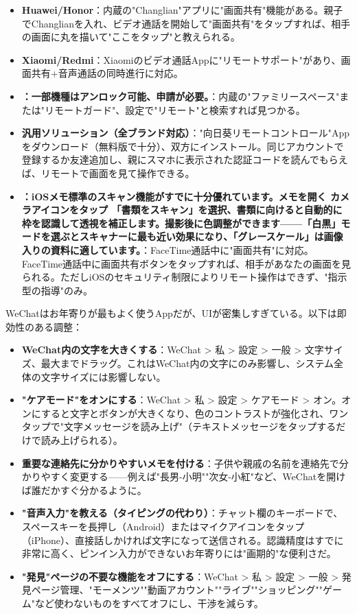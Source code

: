 \begin{itemize}
  \item \textbf{Huawei/Honor}：内蔵の"Changlian"アプリに"画面共有"機能がある。親子でChanglianを入れ、ビデオ通話を開始して"画面共有"をタップすれば、相手の画面に丸を描いて"ここをタップ"と教えられる。
  \item \textbf{Xiaomi/Redmi}：Xiaomiのビデオ通話Appに"リモートサポート"があり、画面共有+音声通話の同時進行に対応。
  \item \textbf{：一部機種はアンロック可能、申請が必要。}：内蔵の"ファミリースペース"または"リモートガード"、設定で"リモート"と検索すれば見つかる。
  \item \textbf{汎用ソリューション（全ブランド対応）}："向日葵リモートコントロール"Appをダウンロード（無料版で十分）、双方にインストール。同じアカウントで登録するか友達追加し、親にスマホに表示された認証コードを読んでもらえば、リモートで画面を見て操作できる。
  \item \textbf{：iOSメモ標準のスキャン機能がすでに十分優れています。メモを開く カメラアイコンをタップ 「書類をスキャン」を選択、書類に向けると自動的に枠を認識して透視を補正します。撮影後に色調整ができます——「白黒」モードを選ぶとスキャナーに最も近い効果になり、「グレースケール」は画像入りの資料に適しています。}：FaceTime通話中に"画面共有"に対応。FaceTime通話中に画面共有ボタンをタップすれば、相手があなたの画面を見られる。ただしiOSのセキュリティ制限によりリモート操作はできず、"指示型の指導"のみ。
\end{itemize}


WeChatはお年寄りが最もよく使うAppだが、UIが密集しすぎている。以下は即効性のある調整：

\begin{itemize}
  \item \textbf{WeChat内の文字を大きくする}：WeChat > 私 > 設定 > 一般 > 文字サイズ、最大までドラッグ。これはWeChat内の文字にのみ影響し、システム全体の文字サイズには影響しない。
  \item \textbf{"ケアモード"をオンにする}：WeChat > 私 > 設定 > ケアモード > オン。オンにすると文字とボタンが大きくなり、色のコントラストが強化され、ワンタップで"文字メッセージを読み上げ"（テキストメッセージをタップするだけで読み上げられる）。
  \item \textbf{重要な連絡先に分かりやすいメモを付ける}：子供や親戚の名前を連絡先で分かりやすく変更する——例えば"長男-小明""次女-小紅"など、WeChatを開けば誰だかすぐ分かるように。
  \item \textbf{"音声入力"を教える（タイピングの代わり）}：チャット欄のキーボードで、スペースキーを長押し（Android）またはマイクアイコンをタップ（iPhone）、直接話しかければ文字になって送信される。認識精度はすでに非常に高く、ピンイン入力ができないお年寄りには"画期的"な便利さだ。
  \item \textbf{"発見"ページの不要な機能をオフにする}：WeChat > 私 > 設定 > 一般 > 発見ページ管理、"モーメンツ""動画アカウント""ライブ""ショッピング""ゲーム"など使わないものをすべてオフにし、干渉を減らす。
\end{itemize}


